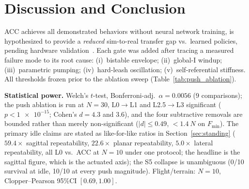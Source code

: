\documentclass[a4paper,fleqn]{cas-dc}
\begin{document}
\section{Discussion and Conclusion}
\label{sec:discussion}

ACC achieves all demonstrated behaviors without neural network training, is hypothesized to provide a \emph{reduced} sim-to-real transfer gap vs.\ learned policies, pending hardware validation~\cite{grimminger2020torque}.
Each gate was added after tracing a measured failure mode to its root cause: (i)~bistable envelope; (ii)~global-I windup; (iii)~parametric pumping; (iv)~hard-leash oscillation; (v)~self-referential stiffness. All thresholds frozen prior to the ablation sweep (Table~\ref{tab:push_ablation}).

\textbf{Statistical power.}
Welch's $t$-test, Bonferroni-adj.\ $\alpha{=}0.0056$ (9 comparisons); the push ablation is run at $N{=}30$, L0$\rightarrow$L1 and L2.5$\rightarrow$L3 significant ($p{<}\num{1e-15}$; Cohen's $d{=}4.3$ and $3.6$), and the four subtractive removals are bounded rather than merely non-significant ($|d|{\le}0.49$, ${<}\SI{1.4}{N}$ on $F_{\min}$). The primary idle claims are stated as like-for-like ratios in Section~\ref{sec:standing} ($59.4{\times}$ sagittal repeatability, $22.6{\times}$ planar repeatability, $5.0{\times}$ lateral repeatability, all L0 vs.\ ACC at $N{=}10$ under one protocol; the headline is the sagittal figure, which is the actuated axis); the S5 collapse is unambiguous (\num{0}/\num{10} survival at idle, \num{10}/\num{10} at every push magnitude). Flight/terrain: $N{=}10$, Clopper--Pearson 95\%CI $[0.69,1.00]$.
\end{document}
